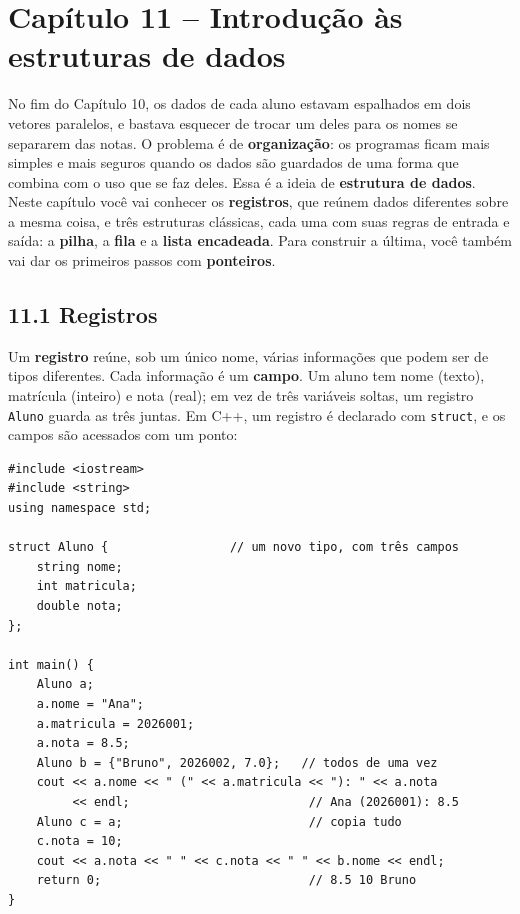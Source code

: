 \section{Capítulo 11 -- Introdução às estruturas de dados}

No fim do Capítulo 10, os dados de cada aluno estavam espalhados em dois vetores paralelos, e bastava esquecer de trocar um deles para os nomes se separarem das notas. O problema é de \textbf{organização}: os programas ficam mais simples e mais seguros quando os dados são guardados de uma forma que combina com o uso que se faz deles. Essa é a ideia de \textbf{estrutura de dados}. Neste capítulo você vai conhecer os \textbf{registros}, que reúnem dados diferentes sobre a mesma coisa, e três estruturas clássicas, cada uma com suas regras de entrada e saída: a \textbf{pilha}, a \textbf{fila} e a \textbf{lista encadeada}. Para construir a última, você também vai dar os primeiros passos com \textbf{ponteiros}.

\subsection{11.1 Registros}

Um \textbf{registro} reúne, sob um único nome, várias informações que podem ser de tipos diferentes. Cada informação é um \textbf{campo}. Um aluno tem nome (texto), matrícula (inteiro) e nota (real); em vez de três variáveis soltas, um registro \texttt{Aluno} guarda as três juntas. Em C++, um registro é declarado com \texttt{struct}, e os campos são acessados com um ponto:

\begin{codigo}
\begin{Verbatim}[breaklines=true, breaksymbolleft={}, fontsize=\footnotesize]
#include <iostream>
#include <string>
using namespace std;

struct Aluno {                 // um novo tipo, com três campos
    string nome;
    int matricula;
    double nota;
};

int main() {
    Aluno a;
    a.nome = "Ana";
    a.matricula = 2026001;
    a.nota = 8.5;
    Aluno b = {"Bruno", 2026002, 7.0};   // todos de uma vez
    cout << a.nome << " (" << a.matricula << "): " << a.nota
         << endl;                         // Ana (2026001): 8.5
    Aluno c = a;                          // copia tudo
    c.nota = 10;
    cout << a.nota << " " << c.nota << " " << b.nome << endl;
    return 0;                             // 8.5 10 Bruno
}
\end{Verbatim}
\end{codigo}

